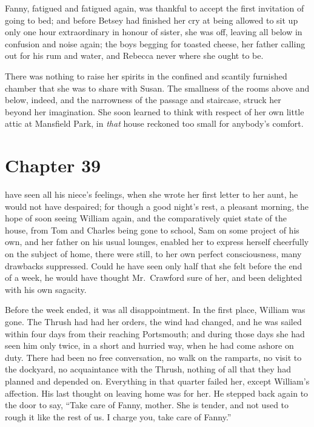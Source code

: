 Fanny, fatigued and fatigued again, was thankful to accept
the first invitation of going to bed; and before Betsey
had finished her cry at being allowed to sit up only one
hour extraordinary in honour of sister, she was off,
leaving all below in confusion and noise again; the boys
begging for toasted cheese, her father calling out for his
rum and water, and Rebecca never where she ought to be.

There was nothing to raise her spirits in the confined
and scantily furnished chamber that she was to share
with Susan.  The smallness of the rooms above and below,
indeed, and the narrowness of the passage and staircase,
struck her beyond her imagination.  She soon learned to think
with respect of her own little attic at Mansfield Park,
in \emph{that} house reckoned too small for anybody's comfort.



\chapter{Chapter 39}

 have seen all his niece's feelings,
when she wrote her first letter to her aunt, he would
not have despaired; for though a good night's rest,
a pleasant morning, the hope of soon seeing William again,
and the comparatively quiet state of the house, from Tom
and Charles being gone to school, Sam on some project of
his own, and her father on his usual lounges, enabled her
to express herself cheerfully on the subject of home,
there were still, to her own perfect consciousness,
many drawbacks suppressed.  Could he have seen only half
that she felt before the end of a week, he would have
thought Mr.\ Crawford sure of her, and been delighted with
his own sagacity.

Before the week ended, it was all disappointment.
In the first place, William was gone.  The Thrush
had had her orders, the wind had changed, and he was
sailed within four days from their reaching Portsmouth;
and during those days she had seen him only twice,
in a short and hurried way, when he had come ashore
on duty.  There had been no free conversation, no walk
on the ramparts, no visit to the dockyard, no acquaintance
with the Thrush, nothing of all that they had planned
and depended on.  Everything in that quarter failed her,
except William's affection.  His last thought on leaving
home was for her.  He stepped back again to the door
to say, ``Take care of Fanny, mother.  She is tender,
and not used to rough it like the rest of us.  I charge you,
take care of Fanny.''


